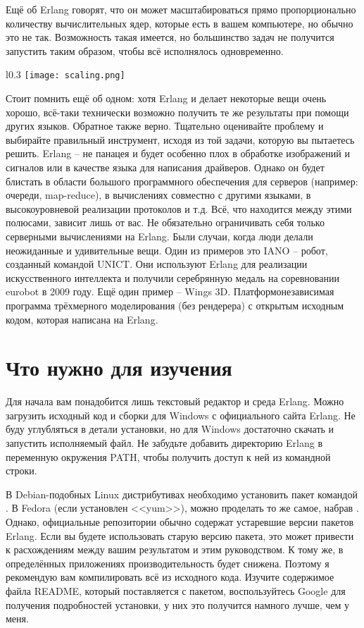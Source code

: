 Ещё об Erlang говорят, что он может масштабироваться прямо пропорционально количеству вычислительных ядер, которые есть в вашем компьютере, но обычно это не так. Возможность такая имеется, но большинство задач не получится запустить таким образом, чтобы всё исполнялось одновременно.
\begin{wrapfigure}{l}{0.3\linewidth}
    \texttt{[image: scaling.png]}
\end{wrapfigure}

Стоит помнить ещё об одном: хотя Erlang и делает некоторые вещи очень хорошо, всё\--таки технически возможно получить те же результаты при помощи других языков. Обратное также верно. Тщательно оценивайте проблему и выбирайте правильный инструмент, исходя из той задачи, которую вы пытаетесь решить. Erlang \--- не панацея и будет особенно плох в обработке изображений и сигналов или в качестве языка для написания драйверов. Однако он будет блистать в области большого программного обеспечения для серверов (например: очереди, map\--reduce), в вычислениях совместно с другими языками, в высокоуровневой реализации протоколов и т.д. Всё, что находится между этими полюсами, зависит лишь от вас. Не обязательно ограничивать себя только серверными вычислениями на Erlang. Были случаи, когда люди делали неожиданные и удивительные вещи. Один из примеров это IANO \--- робот, созданный командой UNICT. Они используют Erlang для реализации искусственного интеллекта и получили серебрянную медаль на соревновании eurobot в 2009 году. Ещё один пример \--- Wings 3D. Платформонезависимая программа трёхмерного моделирования (без рендерера) с открытым исходным кодом, которая написана на Erlang.

\section{Что нужно для изучения}
Для начала вам понадобится лишь текстовый редактор и среда Erlang. Можно загрузить исходный код и сборки для Windows с официального сайта Erlang. Не буду углубляться в детали установки, но для Windows достаточно скачать и запустить исполняемый файл. Не забудьте добавить директорию Erlang в переменную окружения PATH, чтобы получить доступ к ней из командной строки.

В Debian\--подобных Linux дистрибутивах необходимо установить пакет командой . В Fedora (если установлен <<yum>>), можно проделать то же самое, набрав . Однако, официальные репозитории обычно содержат устаревшие версии пакетов Erlang. Если вы будете использовать старую версию пакета, это может привести к расхождениям между вашим результатом и этим руководством. К тому же, в определённых приложениях производительность будет снижена. Поэтому я рекомендую вам компилировать всё из исходного кода. Изучите содержимое файла README, который поставляется с пакетом, воспользуйтесь Google для получения подробностей установки, у них это получится намного лучше, чем у меня.

